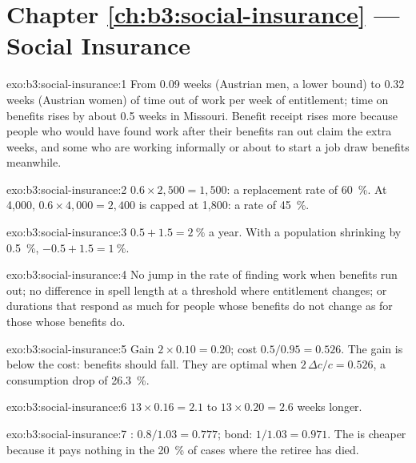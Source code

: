 \section*{Chapter \ref{ch:b3:social-insurance} --- Social Insurance}

\begin{solution}{exo:b3:social-insurance:1}
From 0.09 weeks (Austrian men, a lower bound) to 0.32 weeks (Austrian women) of time
out of work per week of entitlement; time on benefits rises by about 0.5 weeks in
Missouri. Benefit receipt rises more because people who would have found work
after their benefits ran out claim the extra weeks, and some who are working
informally or about to start a job draw benefits meanwhile. %
\end{solution}

\begin{solution}{exo:b3:social-insurance:2}
$0.6 \times 2{,}500 = 1{,}500$: a replacement rate of 60~\%. At 4{,}000, $0.6 \times 4{,}000 = 2{,}400$ is capped at 1{,}800: a rate of
45~\%.
\end{solution}

\begin{solution}{exo:b3:social-insurance:3}
$0.5 + 1.5 = 2~\%$ a year. With a population shrinking by 0.5~\%, $-0.5 + 1.5 = 1~\%$.
\end{solution}

\begin{solution}{exo:b3:social-insurance:4}
No jump in the rate of finding work when benefits run out; no difference in spell
length at a threshold where entitlement changes; or durations that respond as much
for people whose benefits do not change as for those whose benefits do.
\end{solution}

\begin{solution}{exo:b3:social-insurance:5}
Gain $2 \times 0.10 = 0.20$; cost $0.5/0.95 = 0.526$. The gain is below the cost: benefits should fall.
They are optimal when $2\,\Delta c/c = 0.526$, a consumption drop of 26.3~\%.
\end{solution}

\begin{solution}{exo:b3:social-insurance:6}
$13 \times 0.16 = 2.1$ to $13 \times 0.20 = 2.6$ weeks longer.
\end{solution}

\begin{solution}{exo:b3:social-insurance:7}
: $0.8/1.03 = 0.777$; bond: $1/1.03 = 0.971$. The  is cheaper because it pays nothing
in the 20~\% of cases where the retiree has died.
\end{solution}

